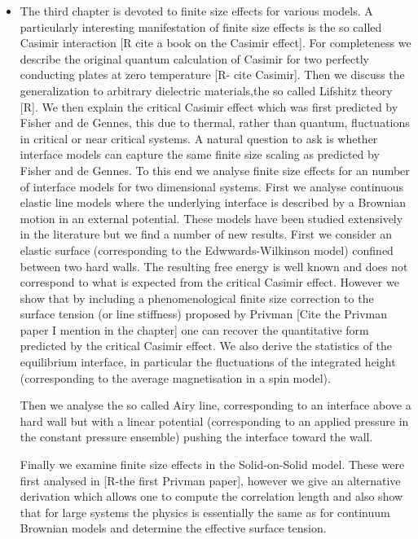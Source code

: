 \begin{itemize}
    \item The third chapter is devoted to finite size effects for various models. A particularly interesting manifestation of finite size effects is the so called Casimir interaction [R cite a book on the Casimir effect]. For completeness we describe the original quantum calculation of Casimir for two perfectly conducting plates at zero temperature [R- cite Casimir]. Then we discuss the generalization to arbitrary  dielectric materials,the so called Lifshitz theory [R]. We then explain the critical Casimir effect which was first predicted by Fisher and de Gennes, this due to thermal, rather than quantum, fluctuations in critical or near critical systems. A natural question to ask is whether interface models can capture the same finite size scaling as predicted by Fisher and de Gennes. To this end we analyse finite size effects for an number of interface models for two dimensional systems. First we analyse continuous elastic line models where the underlying interface is described by a Brownian motion in an external potential. These models have been studied extensively in the literature but we find a number of new results. First we consider an elastic surface (corresponding to the Edwwards-Wilkinson model) confined between two hard walls. The resulting free energy is well known and does not correspond to what is expected from the critical Casimir effect. However we show that by including a phenomenological finite size correction to the surface tension (or line stiffness) proposed by Privman [Cite the Privman paper I mention in the chapter] one can recover the quantitative form predicted by the critical Casimir effect. 
We also derive the statistics of the equilibrium interface, in particular the fluctuations of the integrated height (corresponding to the average magnetisation in a spin model). 

Then we analyse the so called Airy line, corresponding to an interface above a hard wall but with a linear potential (corresponding to an applied pressure in the constant pressure ensemble) pushing the interface toward the wall.

    Finally we examine finite size effects in the Solid-on-Solid model. These were first analysed in [R-the first Privman paper], however we give an alternative derivation which allows one to compute the correlation length and also show that for large systems the physics is essentially the same as for continuum Brownian models and determine the effective surface tension.
    

\end{itemize}
